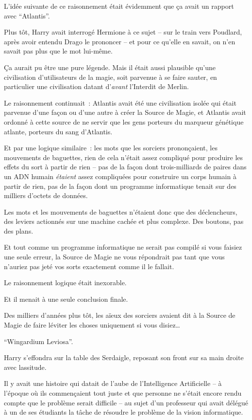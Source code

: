 L'idée suivante de ce raisonnement était évidemment que ça avait un rapport avec “Atlantis”.

Plus tôt, Harry avait interrogé Hermione à ce sujet -- sur le train vers Poudlard, après avoir entendu Drago le prononcer -- et pour ce qu'elle en savait, on n'en savait pas plus que le mot lui-même.

Ça aurait pu être une pure légende. Mais il était aussi plausible qu'une civilisation d'utilisateurs de la magie, soit parvenue à se faire sauter, en particulier une civilisation datant d'\emph{avant} l'Interdit de Merlin.

Le raisonnement continuait~: Atlantis avait été une civilisation isolée qui était parvenue d'une façon ou d'une autre à créer la Source de Magie, et Atlantis avait ordonné à cette source de ne servir que les gens porteurs du marqueur génétique atlante, porteurs du sang d'Atlantis.

Et par une logique similaire~: les mots que les sorciers prononçaient, les mouvements de baguettes, rien de cela n'était assez compliqué pour produire les effets du sort à partir de rien -- pas de la façon dont trois-milliards de paires dans un ADN humain \emph{étaient} assez compliquées pour construire un corps humain à partir de rien, pas de la façon dont un programme informatique tenait sur des milliers d'octets de données.

Les mots et les mouvements de baguettes n'étaient donc que des déclencheurs, des leviers actionnés sur une machine cachée et plus complexe. Des boutons, pas des plans.

Et tout comme un programme informatique ne serait pas compilé si vous faisiez une seule erreur, la Source de Magie ne vous répondrait pas tant que vous n'auriez pas jeté vos sorts exactement comme il le fallait.

Le raisonnement logique était inexorable.

Et il menait à une seule conclusion finale.

Des milliers d'années plus tôt, les aïeux des sorciers avaient dit à la Source de Magie de faire léviter les choses uniquement si vous disiez…

“Wingardium Leviosa”.

Harry s'effondra sur la table des Serdaigle, reposant son front sur sa main droite avec lassitude.

Il y avait une histoire qui datait de l'aube de l'Intelligence Artificielle -- à l'époque où ils commençaient tout juste et que personne ne s'était encore rendu compte que le problème serait difficile -- au sujet d'un professeur qui avait délégué à un de ses étudiants la tâche de résoudre le problème de la vision informatique.


